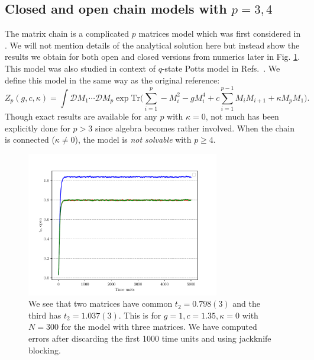 \documentclass[letter,11pt]{article}
\begin{document}
\subsection{\label{subsection:Mchain}Closed and open chain models with $p = 3, 4$}
The matrix chain is a complicated $p$ matrices model which was first considered in \cite{Chadha:1980ri}. We will not mention details of the analytical solution here but instead show the results we obtain for both open and closed versions from numerics later in Fig. \ref{fig:3MM_open}. This model was also studied in context 
of $q$-state Potts model in Refs.~\cite{KAZAKOV198893, KOSTOV1989295, Daul:1994qy}. We define this model in the same way as the original reference: 
\begin{equation}
	\label{eq:Mehta1} 
	Z_{p}(g,c,\kappa) = \int \mathcal{D}M_{1} \cdots  \mathcal{D}M_{p} \exp \mathrm{Tr}\Bigg(\sum_{i=1}^{p} -M_{i}^2  - g M_{i}^{4} + c \sum_{i=1}^{p-1} M_{i}M_{i+1} 
	+ \kappa M_{p}M_{1} \Bigg).
\end{equation} 
Though exact results are available for any $p$ with $\kappa=0$, not much has been explicitly done for $p > 3$ since algebra becomes rather involved. When the chain is connected ($\kappa \neq 0$), the model is \emph{not solvable} with $p \ge 4$. 
\begin{figure}[htbp] 
	\centering 
	\includegraphics[width=0.75\textwidth]{figs/3MM_open.pdf}
	\caption{\label{fig:3MM_open}We see that two matrices have common $t_{2} = 0.798(3)$ and the third has 
	$t_{2} = 1.037(3)$. This is for $g=1, c=1.35, \kappa=0$ with $N=300$ for the model with three matrices. 
	We have computed errors after discarding the first 1000 time units and using jackknife blocking.}
\end{figure}
\end{document}
